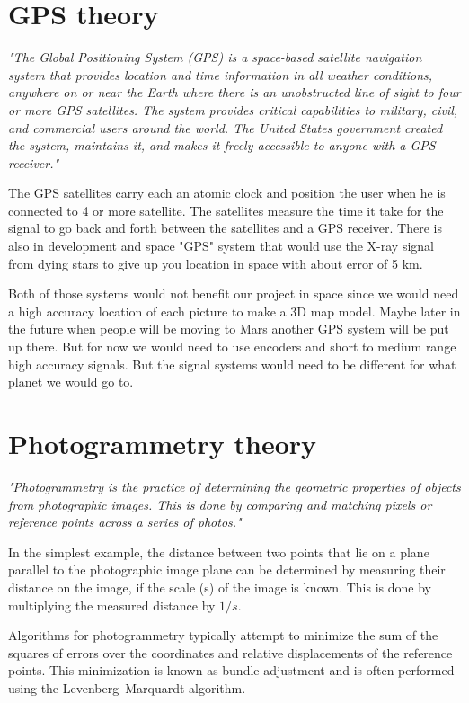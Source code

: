 \section{GPS theory}

\textit{"The Global Positioning System (GPS) is a space-based satellite navigation system that provides location and time information in all weather conditions, anywhere on or near the Earth where there is an unobstructed line of sight to four or more GPS satellites. The system provides critical capabilities to military, civil, and commercial users around the world. The United States government created the system, maintains it, and makes it freely accessible to anyone with a GPS receiver."\cite{GPS1}}

The GPS satellites carry each an atomic clock and position the user when he is connected to 4 or more satellite. The satellites measure the time it take for the signal to go back and forth between the satellites and a GPS receiver.\cite{GPS1} There is also in development and space "GPS" system that would use the X-ray signal from dying stars to give up you location in space with about error of 5 km.\cite{GPS2}

Both of those systems would not benefit our project in space since we would need a high accuracy location of each picture to make a 3D map model. Maybe later in the future when people will be moving to Mars another GPS system will be put up there. But for now we would need to use encoders and short to medium range high accuracy signals. But the signal systems would need to be different for what planet we would go to. 

\section{Photogrammetry theory}

\textit{"Photogrammetry is the practice of determining the geometric properties of objects from
photographic images. This is done by comparing and matching pixels or reference points across a series
of photos."\cite{Photogrammetry}}


In the simplest example, the distance between two points that lie on a plane parallel to the photographic image plane can be determined by measuring their distance on the image, if the scale (s) of the image is known. This is done by multiplying the measured distance by $1/s$.\cite{photo}

Algorithms for photogrammetry typically attempt to minimize the sum of the squares of errors over the coordinates and relative displacements of the reference points. This minimization is known as bundle adjustment and is often performed using the Levenberg–Marquardt algorithm.\cite{photo}

